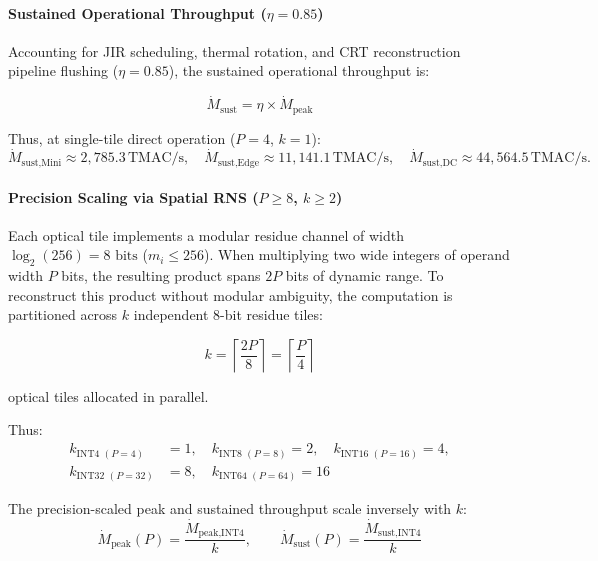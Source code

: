 \documentclass[journal]{IEEEtran}
\begin{document}
\paragraph{\textbf{Sustained Operational Throughput ($\eta = 0.85$)}}
Accounting for JIR scheduling, thermal rotation, and CRT reconstruction pipeline flushing ($\eta = 0.85$), the sustained operational throughput is:

\begin{equation}
\dot{M}_{\text{sust}} = \eta \times \dot{M}_{\text{peak}}
\end{equation}

Thus, at single-tile direct operation ($P=4$, $k=1$):
\begin{equation}
\dot{M}_{\text{sust,Mini}} \approx 2,785.3\,\text{TMAC/s}, \quad \dot{M}_{\text{sust,Edge}} \approx 11,141.1\,\text{TMAC/s}, \quad \dot{M}_{\text{sust,DC}} \approx 44,564.5\,\text{TMAC/s}.
\end{equation}

\paragraph{\textbf{Precision Scaling via Spatial RNS ($P \ge 8$, $k \ge 2$)}} 

Each optical tile implements a modular residue channel of width $\log_2(256) = 8\text{ bits}$ ($m_i \le 256$). When multiplying two wide integers of operand width $P$ bits, the resulting product spans $2P$ bits of dynamic range. To reconstruct this product without modular ambiguity, the computation is partitioned across $k$ independent 8-bit residue tiles:

\begin{equation}
k = \left\lceil\frac{2P}{8} \right\rceil = \left\lceil \frac{P}{4} \right\rceil
\end{equation}

optical tiles allocated in parallel.

Thus:
\[
\begin{aligned}
k_{\text{INT4 }(P=4)} &= 1, \quad
k_{\text{INT8 }(P=8)} = 2, \quad
k_{\text{INT16 }(P=16)} = 4,\\
k_{\text{INT32 }(P=32)} &= 8, \quad
k_{\text{INT64 }(P=64)} = 16
\end{aligned}
\]

The precision-scaled peak and sustained throughput scale inversely with $k$:
\begin{equation}
\dot{M}_{\text{peak}}(P) = \frac{\dot{M}_{\text{peak,INT4}}}{k}, \qquad \dot{M}_{\text{sust}}(P) = \frac{\dot{M}_{\text{sust,INT4}}}{k}
\end{equation}
\end{document}

